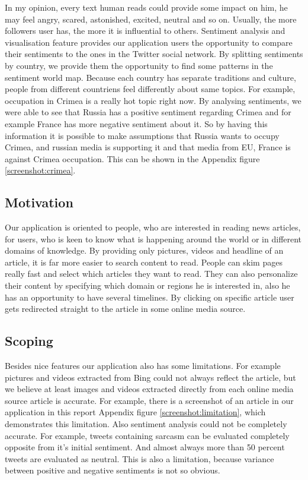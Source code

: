 \documentclass{acm_proc_10ptArticle-sp}
\begin{document}
In my opinion, every text human reads could provide some impact on him, he may feel angry, scared, astonished, excited, neutral and so on. Usually, the more followers user has, the more it is influential to others. Sentiment analysis and visualisation feature provides our application users the opportunity to compare their sentiments to the ones in the Twitter social network. By splitting sentiments by country, we provide them the opportunity to find some patterns in the sentiment world map. Because each country has separate traditions and culture, people from different countriens feel differently about same topics. For example, occupation in Crimea is a really hot topic right now. By analysing sentiments, we were able to see that Russia has a positive sentiment regarding Crimea and for example France has more negative sentiment about it. So by having this information it is possible to make assumptions that Russia wants to occupy Crimea, and russian media is supporting it and that media from EU, France is against Crimea occupation. This can be shown in the Appendix figure \ref{screenshot:crimea}.

\subsection{Motivation}

Our application is oriented to people, who are interested in reading news articles, for users, who is keen to know what is happening around the world or in different domains of knowledge. By providing only pictures, videos and headline of an article, it is far more easier to search content to read. People can skim pages really fast and select which articles they want to read. They can also personalize their content by specifying which domain or regions he is interested in, also he has an opportunity to have several timelines. By clicking on specific article user gets redirected straight to the article in some online media source.

\subsection{Scoping}

Besides nice features our application also has some limitations. For example pictures and videos extracted from Bing could not always reflect the article, but we believe at least images and videos extracted directly from each online media source article is accurate. For example, there is a screenshot of an article in our application in this report Appendix figure \ref{screenshot:limitation}, which demonstrates this limitation. Also sentiment analysis could not be completely accurate. For example, tweets containing sarcasm can be evaluated completely opposite from it's initial sentiment. And almost always more than 50 percent tweets are evaluated as neutral. This is also a limitation, because variance between positive and negative sentiments is not so obvious.
\end{document}
